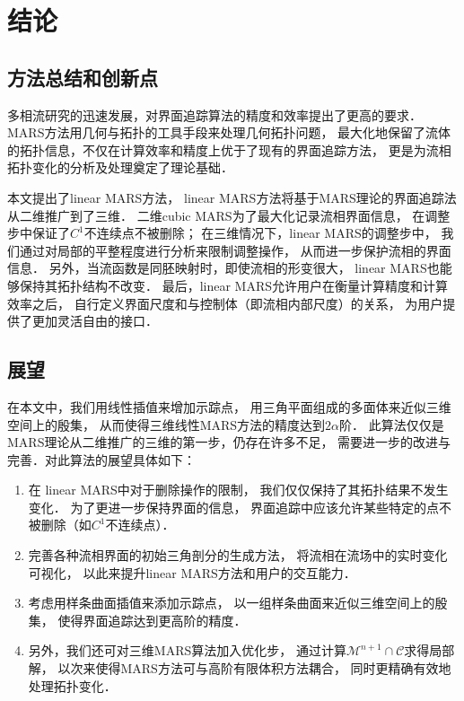 
\chapter{结论}
\section{方法总结和创新点}
多相流研究的迅速发展，对界面追踪算法的精度和效率提出了更高的要求．
MARS方法用几何与拓扑的工具手段来处理几何拓扑问题，
最大化地保留了流体的拓扑信息，不仅在计算效率和精度上优于了现有的界面追踪方法，
更是为流相拓扑变化的分析及处理奠定了理论基础．

本文提出了linear MARS方法，
linear MARS方法将基于MARS理论的界面追踪法从二维推广到了三维．
二维cubic MARS为了最大化记录流相界面信息，
在调整步中保证了$C^1$不连续点不被删除；
在三维情况下，linear MARS的调整步中，
我们通过对局部的平整程度进行分析来限制调整操作，
从而进一步保护流相的界面信息．
另外，当流函数是同胚映射时，即使流相的形变很大，
linear MARS也能够保持其拓扑结构不改变．
最后，linear MARS允许用户在衡量计算精度和计算效率之后，
自行定义界面尺度和与控制体（即流相内部尺度）的关系，
为用户提供了更加灵活自由的接口．
\section{展望}
在本文中，我们用线性插值来增加示踪点，
用三角平面组成的多面体来近似三维空间上的殷集，
从而使得三维线性MARS方法的精度达到$2\alpha$阶．
此算法仅仅是MARS理论从二维推广的三维的第一步，仍存在许多不足，
需要进一步的改进与完善．对此算法的展望具体如下：
\begin{enumerate}
		 		\setlength{\itemsep}{0pt}
	\setlength{\parsep}{0pt}
	\setlength{\parskip}{0pt}
	\item 在 linear MARS中对于删除操作的限制，
	我们仅仅保持了其拓扑结果不发生变化．
	为了更进一步保持界面的信息，
	界面追踪中应该允许某些特定的点不被删除（如$C^1$不连续点）．
	\item 完善各种流相界面的初始三角剖分的生成方法，
	将流相在流场中的实时变化可视化，
	以此来提升linear MARS方法和用户的交互能力．
	\item 考虑用样条曲面插值来添加示踪点，
	以一组样条曲面来近似三维空间上的殷集，
	使得界面追踪达到更高阶的精度．
	\item 另外，我们还可对三维MARS算法加入优化步，
	通过计算$\mathcal{M}^{n+1}\cap\mathcal{C}$求得局部解，
	以次来使得MARS方法可与高阶有限体积方法耦合，
	同时更精确有效地处理拓扑变化．
\end{enumerate}




